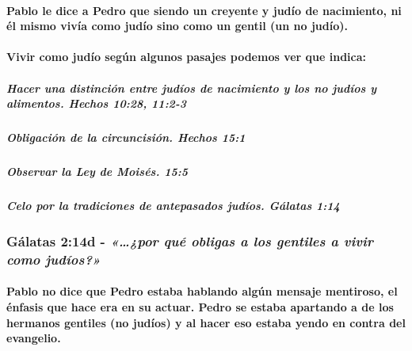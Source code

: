 \documentclass[11a pt,twoside]{article}
\newcommand{\scripture}[1]{%
  {\fontsize{12pt}{16pt}\selectfont\ScriptureFont\itshape #1}%
}
\let\oldsubsubsection\subsubsection
\renewcommand{\subsubsection}{\needspace{4\baselineskip}\oldsubsubsection}
\let\oldparagraph\paragraph
\renewcommand{\paragraph}{\needspace{3\baselineskip}\oldparagraph}
\let\oldsubparagraph\subparagraph
\renewcommand{\subparagraph}{\needspace{2\baselineskip}\oldsubparagraph}
\begin{document}
\paragraph{Pablo le dice a Pedro que siendo un creyente y judío de
nacimiento, ni él mismo vivía como judío sino como un gentil (un no
judío).}\label{pablo-le-dice-a-pedro-que-siendo-un-creyente-y-juduxedo-de-nacimiento-ni-uxe9l-mismo-vivuxeda-como-juduxedo-sino-como-un-gentil-un-no-juduxedo.}

\paragraph{Vivir como judío según algunos pasajes podemos ver que
indica:}\label{vivir-como-juduxedo-seguxfan-algunos-pasajes-podemos-ver-que-indica}

\subparagraph{Hacer una distinción entre judíos de nacimiento y los no
judíos y alimentos. Hechos 10:28,
11:2-3}\label{hacer-una-distinciuxf3n-entre-juduxedos-de-nacimiento-y-los-no-juduxedos-y-alimentos.-hechos-1028-112-3}

\subparagraph{Obligación de la circuncisión. Hechos
15:1}\label{obligaciuxf3n-de-la-circuncisiuxf3n.-hechos-151}

\subparagraph{Observar la Ley de Moisés.
15:5}\label{observar-la-ley-de-moisuxe9s.-155}

\subparagraph{Celo por la tradiciones de antepasados judíos. Gálatas
1:14}\label{celo-por-la-tradiciones-de-antepasados-juduxedos.-guxe1latas-114}

\subsubsection{\texorpdfstring{Gálatas 2:14d -
\scripture{«…¿por qué obligas a los gentiles a vivir como judíos?»}}{Gálatas 2:14d - }}\label{guxe1latas-214d---por-quuxe9-obligas-a-los-gentiles-a-vivir-como-juduxedos}

\paragraph{Pablo no dice que Pedro estaba hablando algún mensaje
mentiroso, el énfasis que hace era en su actuar. Pedro se estaba
apartando a de los hermanos gentiles (no judíos) y al hacer eso estaba
yendo en contra del
evangelio.}\label{pablo-no-dice-que-pedro-estaba-hablando-alguxfan-mensaje-mentiroso-el-uxe9nfasis-que-hace-era-en-su-actuar.-pedro-se-estaba-apartando-a-de-los-hermanos-gentiles-no-juduxedos-y-al-hacer-eso-estaba-yendo-en-contra-del-evangelio.}
\end{document}
